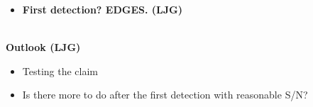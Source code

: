 \begin{itemize}
\item
  \textbf{First detection? EDGES. (LJG)}
\end{itemize}

\textbf{}\\

\textbf{Outlook (LJG)}

\begin{itemize}
\item
  Testing the claim
\item
  Is there more to do after the first detection with reasonable S/N?
\end{itemize}






